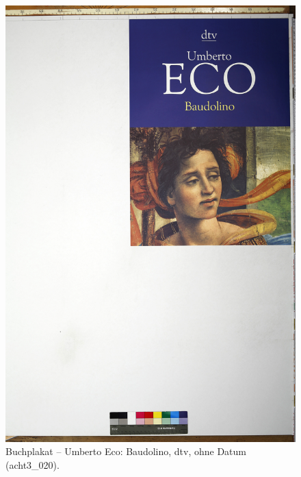 \documentclass[a4paper,12pt,ngerman]{article}
\begin{document}
\newpage
\begin{figure}[ht]
\includegraphics[width=\linewidth]{Abbildung_12_(acht3_020)}
\centering
\caption{Buchplakat -- Umberto Eco: Baudolino, dtv, ohne Datum (acht3\_020).}
\end{figure}
\end{document}

